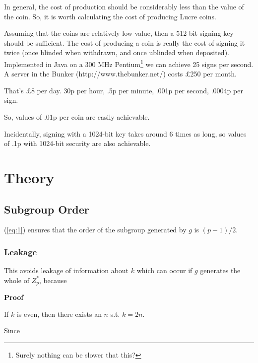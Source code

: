 \documentclass[a4paper,titlepage]{article}
\begin{document}
In general, the cost of production should be considerably
less than the value of the coin. So, it is worth calculating the cost
of producing Lucre coins.

Assuming that the coins are relatively low value, then a 512 bit
signing key should be sufficient. The cost of producing a coin is
really the cost of signing it twice (once blinded when withdrawn, and
once ublinded when deposited). Implemented in Java on a 300 MHz
Pentium\footnote{Surely nothing can be slower that this?} we can
achieve 25 signs per second. A server in the Bunker
(http://www.thebunker.net/) costs \pounds250 per month.

That's \pounds8 per day. 30p per hour, .5p per minute, .001p per second,
.0004p per sign.

So, values of .01p per coin are easily achievable.

Incidentally, signing with a 1024-bit key takes around 6 times as
long, so values of .1p with 1024-bit security are also achievable.

\section{Theory}

\subsection{Subgroup Order}
\label{sec:theory1}

(\ref{eq:1}) ensures that the order of the subgroup generated by $g$ is
$(p-1)/2$.

\subsubsection{Leakage}

This avoids leakage of information about $k$ which can
occur if $g$ generates the whole of $Z_p^*$, because


{\bf Proof}

If $k$ is even, then there exists an $n$
s.t. $k=2n$.


Since
\end{document}
